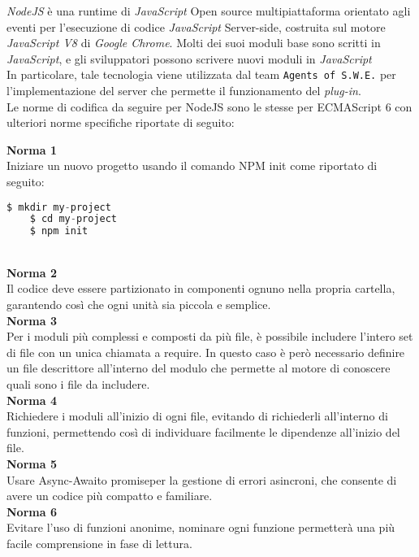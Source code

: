 \textit{NodeJS} è una runtime di \textit{JavaScript} Open source multipiattaforma orientato agli eventi per l'esecuzione di codice \textit{JavaScript} Server-side, costruita sul motore \textit{JavaScript V8} di \textit{Google Chrome}. Molti dei suoi moduli base sono scritti in \textit{JavaScript}, e gli sviluppatori possono scrivere nuovi moduli in \textit{JavaScript}\\
In particolare, tale tecnologia viene utilizzata dal team \texttt{Agents of S.W.E.} per l'implementazione del server che permette il funzionamento del \textit{plug-in}. \\
Le norme di codifica da seguire per NodeJS sono le stesse per ECMAScript 6 con ulteriori norme specifiche riportate di seguito:

\textbf{Norma 1} \\
Iniziare un nuovo progetto usando il comando NPM init come riportato di seguito:
\begin{lstlisting}[language=JavaScript]
	$ mkdir my-project
	$ cd my-project
	$ npm init
\end{lstlisting}

\-\\

\textbf{Norma 2} \\
Il codice deve essere partizionato in componenti ognuno nella propria cartella, garantendo così che ogni unità sia piccola e semplice. 
\-\\

\textbf{Norma 3} \\
Per i moduli più complessi e composti da più file, è possibile includere l’intero set di file con un unica chiamata a require. In questo caso è però necessario definire un file descrittore all’interno del modulo che permette al motore di conoscere quali sono i file da includere.
\-\\

\textbf{Norma 4} \\
Richiedere i moduli all'inizio di ogni file, evitando di richiederli all'interno di funzioni, permettendo così di individuare facilmente le dipendenze all'inizio del file.
\-\\

\textbf{Norma 5} \\
Usare Async-Await\glossario o promise\glossario per la gestione di errori asincroni, che consente di avere un codice più compatto e familiare.
\-\\

\textbf{Norma 6} \\
Evitare l'uso di funzioni anonime, nominare ogni funzione permetterà una più facile comprensione in fase di lettura.
\-\\

  



